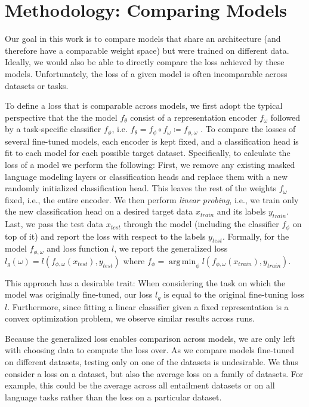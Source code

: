 \documentclass[nohyperref]{article}
\theoremstyle{plain}
\theoremstyle{definition}
\theoremstyle{remark}
\DeclareMathOperator*{\argmin}{arg\,min}
\begin{document}
\section{Methodology: Comparing Models}
Our goal in this work is to compare models that share an architecture (and therefore have a comparable weight space) but were trained on different data.
Ideally, we would also be able to directly compare the loss achieved by these models.
Unfortunately, the loss of a given model is often incomparable across datasets or tasks. 

To define a loss that is comparable across models, we first adopt the typical perspective that the the model $f_\theta$ consist of a representation encoder $f_\omega$ followed by a task-specific classifier $f_\phi$, i.e. $f_\theta = f_\phi \circ f_\omega \coloneqq f_{\phi,\omega} $ \citep{choshen2022start,Rame2022RecyclingDM}. 
To compare the losses of several fine-tuned models, each encoder is kept fixed, and a classification head is fit to each model for each possible target dataset.
Specifically, to calculate the loss of a model we perform the following: First, we remove any existing masked language modeling layers or classification heads and replace them with a new randomly initialized classification head. This leaves the rest of the weights $f_\omega$ fixed, i.e., the entire encoder. We then perform \emph{linear probing}, i.e., we train only the new classification head on a desired target data $x_{train}$ and its labels $ y_{train}$. Last, we pass the test data $x_{test}$ through the model (including the classifier $f_{\phi}$ on top of it) and report the loss with respect to the labels $y_{test}$. 
Formally, for the model $f_{\phi,\omega}$ and loss function $l$, we report the generalized loss $l_g(\omega)=l(f_{\phi,\omega}(x_{test}),y_{test})$ 
where $f_{\phi}=\argmin_{\phi} l(f_{\phi,\omega}(x_{train}),y_{train})$.

This approach has a desirable trait: When considering the task on which the model was originally fine-tuned, our loss $l_g$ is equal to the original fine-tuning loss $l$.
Furthermore, since fitting a linear classifier given a fixed representation is a convex optimization problem, we observe similar results across runs. 

Because the generalized loss enables comparison across models, we are only left with choosing data to compute the loss over. %
As we compare models fine-tuned on different datasets, testing only on one of the datasets is undesirable. We thus consider a loss on a dataset, but also the average loss on a family of datasets. For example, this could be the average across all entailment datasets or on all language tasks rather than the loss on a particular dataset.
\end{document}
